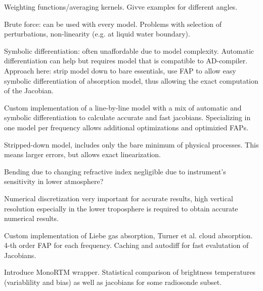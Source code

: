         Weighting functions/averaging kernels. Givve examples for different
        angles.

    \stopsubsection

    \startsubsection[title=Calculating the Jacobian]

        Brute force: can be used with every model. Problems with selection of
        perturbations, non-linearity (e.g. at liquid water boundary).

        Symbolic differentiation: often unaffordable due to model complexity.
        Automatic differentiation can help but requires model that is
        compatible to AD-compiler. Approach here: strip model down to bare
        essentials, use FAP to allow easy symbolic differentiation of
        absorption model, thus allowing the exact computation of the Jacobian.
        
    \stopsubsection

\stopsection


\startsection[title=A Numerical Model]

    Custom implementation of a line-by-line model with a mix of automatic and
    symbolic differentiation to calculate accurate and fast jacobians.
    Specializing in one model per frequency allows additional optimizations
    and optimizied FAPs.

    Stripped-down model, includes only the bare minimum of physical processes.
    This means larger errors, but allows exact linearization.

    Bending due to changing refractive index negligible due to instrument's
    sensitivity in lower atmosphere?

    Numerical discretization very important for accurate results, high vertical
    resolution especially in the lower troposphere is required to obtain
    accurate numerical results.

    \startsubsection[title=Implementation]

        Custom implementation of Liebe gas absorption, Turner et al. cloud
        absorption. 4-th order FAP for each frequency. Caching and autodiff
        for fast evalutation of Jacobians.

    \stopsubsection

    \startsubsection[title=Comparison with MonoRTM]

        Introduce MonoRTM wrapper. Statistical comparison of brightness
        temperatures (variablility and bias) as well as jacobians for some
        radiosonde subset.

